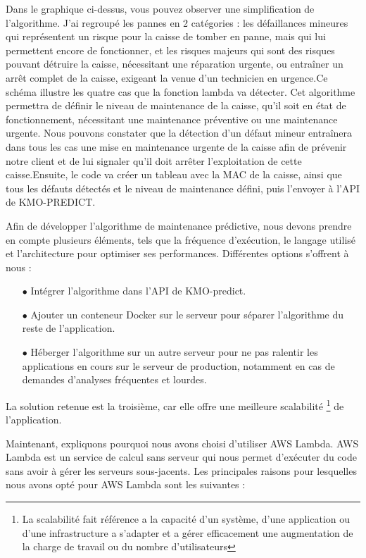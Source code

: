 \documentclass[12pt]{article}
\begin{document}
\justify
\text Dans le graphique ci-dessus, vous pouvez observer une simplification de l'algorithme. J'ai regroupé les pannes en 2 catégories : les défaillances mineures qui représentent un risque pour la caisse de tomber en panne, mais qui lui permettent encore de fonctionner, et les risques majeurs qui sont des risques pouvant détruire la caisse, nécessitant une réparation urgente, ou entraîner un arrêt complet de la caisse, exigeant la venue d'un technicien en urgence.Ce schéma illustre les quatre cas que la fonction lambda va détecter. Cet algorithme permettra de définir le niveau de maintenance de la caisse, qu'il soit en état de fonctionnement, nécessitant une maintenance préventive ou une maintenance urgente. Nous pouvons constater que la détection d'un défaut mineur entraînera dans tous les cas une mise en maintenance urgente de la caisse afin de prévenir notre client et de lui signaler qu'il doit arrêter l'exploitation de cette caisse.Ensuite, le code va créer un tableau avec la MAC de la caisse, ainsi que tous les défauts détectés et le niveau de maintenance défini, puis l'envoyer à l'API de KMO-PREDICT.

\justify
\text Afin de développer l'algorithme de maintenance prédictive, nous devons prendre en compte plusieurs éléments, tels que la fréquence d'exécution, le langage utilisé et l'architecture pour optimiser ses performances. Différentes options s'offrent à nous :

\begin{itemize}
    \item[$\bullet$] Intégrer l'algorithme dans l'API de KMO-predict.
    \item[$\bullet$] Ajouter un conteneur Docker sur le serveur pour séparer l'algorithme du reste de l'application.
    \item[$\bullet$] Héberger l'algorithme sur un autre serveur pour ne pas ralentir les applications en cours sur le serveur de production, notamment en cas de demandes d'analyses fréquentes et lourdes.
    
\end{itemize}
\text La solution retenue est la troisième, car elle offre une meilleure scalabilité \footnote{La scalabilité fait référence a la capacité d’un système, d’une application ou d’une infrastructure a s’adapter et a gérer efficacement une augmentation de la charge de travail ou du nombre d’utilisateurs} de l'application.

\justify
\text Maintenant, expliquons pourquoi nous avons choisi d'utiliser AWS Lambda. AWS Lambda est un service de calcul sans serveur qui nous permet d'exécuter du code sans avoir à gérer les serveurs sous-jacents. Les principales raisons pour lesquelles nous avons opté pour AWS Lambda sont les suivantes :
\end{document}
